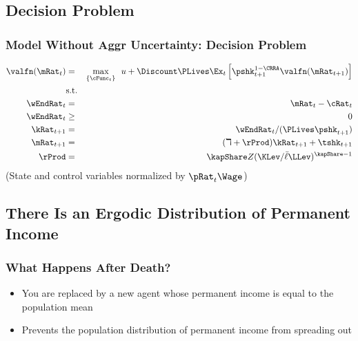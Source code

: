 \subsection{Decision Problem}
\begin{frame}
\frametitle{{Model Without Aggr Uncertainty: Decision Problem}}

\providecommand{\util}{u}

\begin{eqnarray*}
\valfn(\mRat_{t})&=& \underset{\{\cFunc_{t}\}}{\max } ~~
\util%
+\Discount \PLives \Ex_{t}\left[ \pshk_{t+1}^{1-\CRRA}\valfn(\mRat_{t+1})
\right]   \label{eq:hetdecisionprobnashk}\\
\notag &\text{s.t.}&\\
\notag \wEndRat_{t} &=&\mRat_{t}-\cRat_{t} \\
\notag \wEndRat_{t} &\geq &0 \\
\kRat_{t+1} &=&\wEndRat_{t}/(\PLives \pshk_{t+1})  \label{indconst3}
\\
\mRat_{t+1} &=&(\daleth +\rProd)\kRat_{t+1}+\tshk_{t+1} \label{indconst4} \\
\notag \rProd &=&\kapShare\ptyLev(\KLev/\bar{\ell}\LLev)^{\kapShare-1}
\end{eqnarray*}
(State and control variables normalized by $\pRat_{t} \Wage$)

\end{frame}


\subsection{There Is an Ergodic Distribution of Permanent Income}
\begin{frame}
\frametitle{{What Happens After Death?}}

\pause
\begin{itemize}
\item You are replaced by a new agent whose permanent income is equal to the population mean
\item Prevents the population distribution of permanent income from spreading out
\end{itemize}
\end{frame}


